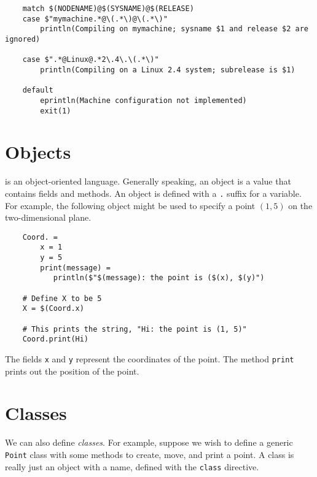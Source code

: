 \begin{verbatim}
    match $(NODENAME)@$(SYSNAME)@$(RELEASE)
    case $"mymachine.*@\(.*\)@\(.*\)"
        println(Compiling on mymachine; sysname $1 and release $2 are ignored)

    case $".*@Linux@.*2\.4\.\(.*\)"
        println(Compiling on a Linux 2.4 system; subrelease is $1)

    default
        eprintln(Machine configuration not implemented)
        exit(1)
\end{verbatim}

%
\section{Objects}
\label{section:objects}

\OMake{} is an object-oriented language.  Generally speaking, an object is a value that contains fields
and methods.  An object is defined with a \verb+.+ suffix for a variable.  For example, the
following object might be used to specify a point $(1, 5)$ on the two-dimensional plane.

\begin{verbatim}
    Coord. =
        x = 1
        y = 5
        print(message) =
           println($"$(message): the point is ($(x), $(y)")

    # Define X to be 5
    X = $(Coord.x)

    # This prints the string, "Hi: the point is (1, 5)"
    Coord.print(Hi)
\end{verbatim}

The fields \verb+x+ and \verb+y+ represent the coordinates of the point.  The method \verb+print+
prints out the position of the point.

\section{Classes}

We can also define \emph{classes}.  For example, suppose we wish to define a generic \verb+Point+
class with some methods to create, move, and print a point.  A class is really just an object with
a name, defined with the \verb+class+ directive.


